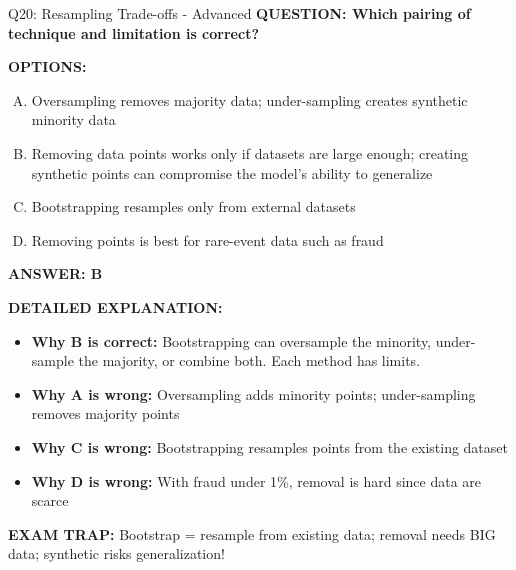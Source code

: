 \documentclass[8pt]{beamer}
\begin{document}
\begin{frame}[shrink=6]{Q20: Resampling Trade-offs - Advanced}
\fontsize{6.5}{7.5}\selectfont
\textbf{QUESTION: Which pairing of technique and limitation is correct?}

\vspace{0.1cm}
\textbf{OPTIONS:}
\begin{enumerate}[A.]
\item Oversampling removes majority data; under-sampling creates synthetic minority data
\item Removing data points works only if datasets are large enough; creating synthetic points can compromise the model's ability to generalize
\item Bootstrapping resamples only from external datasets
\item Removing points is best for rare-event data such as fraud
\end{enumerate}

\vspace{0.1cm}
\textcolor{myblue}{\textbf{ANSWER: B}}

\vspace{0.1cm}
\textbf{DETAILED EXPLANATION:}
\begin{itemize}
\item \textbf{Why B is correct:} Bootstrapping can oversample the minority, under-sample the majority, or combine both. Each method has limits.
\item \textbf{Why A is wrong:} Oversampling adds minority points; under-sampling removes majority points
\item \textbf{Why C is wrong:} Bootstrapping resamples points from the existing dataset
\item \textbf{Why D is wrong:} With fraud under 1\%, removal is hard since data are scarce
\end{itemize}

\textcolor{myred}{\textbf{EXAM TRAP:}} Bootstrap = resample from existing data; removal needs BIG data; synthetic risks generalization!
\end{frame}
\end{document}

